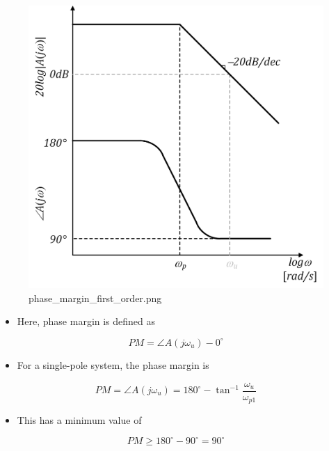 \documentclass[11pt]{article}
\providecommand{\tightlist}{%
      \setlength{\itemsep}{0pt}\setlength{\parskip}{0pt}}
\begin{document}
    \begin{figure}
\centering
\includegraphics{phase_margin_first_order.png}
\caption{phase\_margin\_first\_order.png}
\end{figure}

    \begin{itemize}
\tightlist
\item
  Here, phase margin is defined as
\end{itemize}

\begin{equation}
PM = \angle A(j\omega_u) - 0^{\circ}
\end{equation}

\begin{itemize}
\tightlist
\item
  For a single-pole system, the phase margin is
\end{itemize}

\begin{equation}
PM = \angle A(j\omega_u) = 180^{\circ} - \tan^{-1}\dfrac{\omega_u}{\omega_{p1}}
\end{equation}

\begin{itemize}
\tightlist
\item
  This has a minimum value of
\end{itemize}

\begin{equation}
PM \geq 180^{\circ} - 90^{\circ} = 90^{\circ}
\end{equation}
\end{document}
